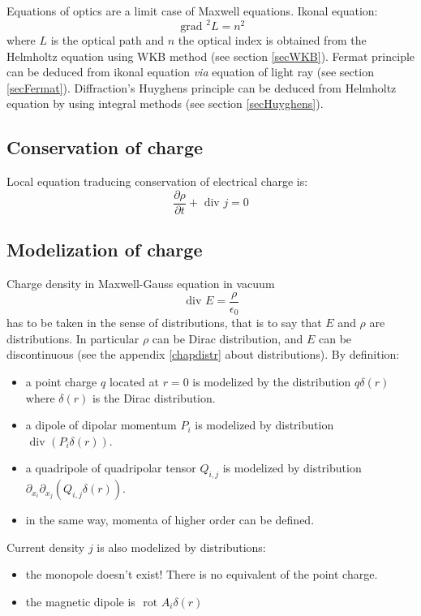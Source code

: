 \documentclass[12pt]{book}
\begin{document}
\begin{rem}
Equations of optics are a limit case of Maxwell equations. Ikonal equation:
\begin{equation}
\mbox{ grad }^2 L=n^2
\end{equation}    
where $L$ is the optical path and $n$ the optical index is obtained from the
Helmholtz equation using WKB method (see section \ref{secWKB}). Fermat
principle can be deduced from ikonal equation {\it via} equation of light ray
(see section \ref{secFermat}). Diffraction's Huyghens principle can be deduced
from Helmholtz equation by using integral methods (see section
\ref{secHuyghens}). 
\end{rem} 




\subsection{Conservation of charge}
Local equation traducing conservation of electrical charge is:
\begin{equation}\label{eqconsdelacharge}
\frac{\partial \rho}{\partial t}+\mbox{ div }{j}=0
\end{equation}
\subsection{Modelization of charge}\label{secmodelcha}
Charge density in Maxwell-Gauss equation in vacuum 
\begin{equation}
\mbox{ div } E=\frac{\rho}{\epsilon_0}
\end{equation}
has to be taken in the sense of distributions, that is to say that $E$ and
$\rho$ are distributions. In particular $\rho$ can be Dirac distribution, and
$E$ can be discontinuous (see the appendix \ref{chapdistr} about
distributions). 
By definition:
\begin{itemize}
\item a point charge  $q$ located at  $r=0$ is modelized by the distribution
  $q\delta(r)$ where $\delta(r)$ is the Dirac distribution.
\item a dipole of dipolar momentum $P_i$ is modelized by
  distribution $\mbox{ div }(P_i\delta(r))$. 
\item a quadripole of quadripolar tensor
$Q_{i,j}$ is modelized by distribution
$\partial_{x_i}\partial_{x_j}(Q_{i,j}\delta(r))$. 
\item in the same way, momenta of higher order can be defined.
\end{itemize}
Current density $j$ is also modelized by distributions:
\begin{itemize}
\item the monopole doesn't exist! There is no equivalent of the point charge.
\item the magnetic dipole is $\mbox{ rot } A_i\delta(r)$
\end{itemize}
\end{document}
